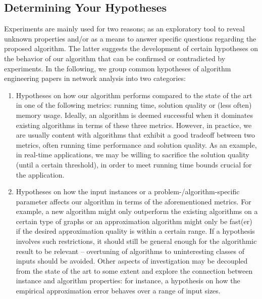 \documentclass[algorithms,article,submit,moreauthors,pdftex]{Definitions/mdpi}
\newcounter{guideline}
\newcommand{\changed}[1]{#1}
\begin{document}
\subsection{Determining Your Hypotheses}
\label{sub:guidelines:hypotheses}
%
Experiments are mainly used for two reasons;
as an exploratory tool to reveal unknown properties
and/or as a means to answer specific questions regarding the proposed algorithm.
%
The latter suggests the development of certain hypotheses
on the behavior of our algorithm that can be confirmed or contradicted by experiments.
%
In the following, we group common hypotheses of algorithm
engineering papers in network
analysis into two categories:

\begin{enumerate}
\item \label{hyp:1} Hypotheses on how our algorithm performs compared to
  the state of the art in one of the
  following metrics: running time, solution quality or
  (less often) memory usage.
  Ideally, an algorithm is deemed successful when it \changed{dominates}
  existing algorithms in terms of \changed{these}
  three metrics. However, in practice,
  we are \changed{usually} content with algorithms that exhibit a good tradeoff
  between two metrics, often running time performance and
  solution quality.
%
  As an example,
  in real-time applications,
  we may be willing to sacrifice the solution quality
  (until a certain threshold), in order to meet
  running time bounds crucial for the application.

\item \label{hyp:2} Hypotheses on how the input instances or a
  problem-/algorithm-specific parameter affects our algorithm in terms of the
  aforementioned metrics.
%
  For example, a new algorithm might only outperform the
  existing algorithms on a certain type of graphs or an
  approximation algorithm might only be fast(er) if
  the desired approximation quality is within a certain range.
  If a hypothesis involves such
  restrictions, it should still be general enough for the algorithmic result to be relevant --
  overtuning of algorithms to uninteresting classes of
  inputs should be avoided.
%
  Other aspects of investigation may be decoupled from the state of the art to some
  extent and explore the connection between instance and algorithm properties:
  for instance, a hypothesis on how the empirical approximation error behaves over
  a range of input sizes.

\end{enumerate}
\end{document}
